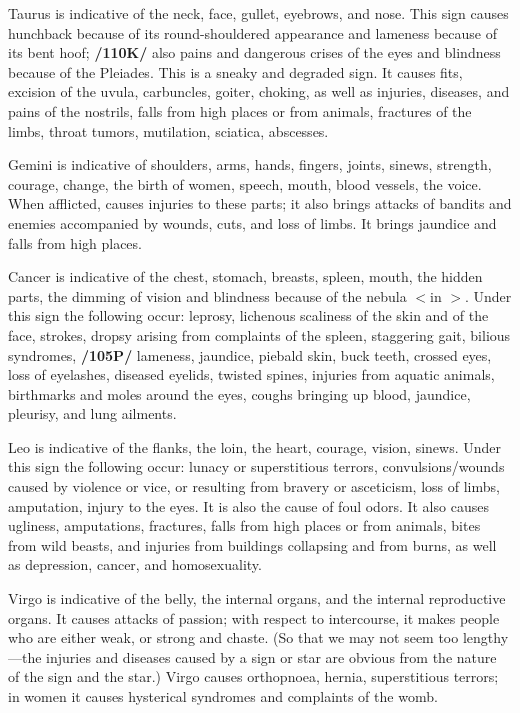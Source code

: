 Taurus \mn{\Taurus} is indicative of the neck, face, gullet, eyebrows, and nose. This sign causes hunchback because
of its round-shouldered appearance and lameness because of its bent hoof; \textbf{/110K/} also pains and dangerous crises of the eyes and blindness because of the Pleiades. This is a sneaky and degraded sign. It causes fits, excision of the uvula, carbuncles, goiter, choking, as well as injuries, diseases, and pains of the nostrils, falls from high places or from animals, fractures of the limbs, throat tumors, mutilation, sciatica, abscesses.

Gemini \mn{\Gemini} is indicative of shoulders, arms, hands, fingers, joints, sinews, strength, courage, change, the
birth of women, speech, mouth, blood vessels, the voice. When afflicted, \Gemini\xspace causes injuries to these parts; it also brings attacks of bandits and enemies accompanied by wounds, cuts, and loss of limbs. It brings jaundice and falls from high places.

Cancer \mn{\Cancer} is indicative of the chest, stomach, breasts, spleen, mouth, the hidden parts, the dimming of vision and blindness because of the nebula $<$in \Cancer$>$. Under this sign the following occur: leprosy,
lichenous scaliness of the skin and of the face, strokes, dropsy arising from complaints of the spleen, staggering gait, bilious syndromes, \textbf{/105P/} lameness, jaundice, piebald skin, buck teeth, crossed eyes, loss of eyelashes, diseased eyelids, twisted spines, injuries from aquatic animals, birthmarks and moles around the eyes, coughs bringing up blood, jaundice, pleurisy, and lung ailments.

Leo \mn{\Leo} is indicative of the flanks, the loin, the heart, courage, vision, sinews. Under this sign the
following occur: lunacy or superstitious terrors, convulsions/wounds caused by violence or vice, or resulting from bravery or asceticism, loss of limbs, amputation, injury to the eyes. It is also the cause of foul odors. It also causes ugliness, amputations, fractures, falls from high places or from animals, bites from wild beasts, and injuries from buildings collapsing and from burns, as well as depression, cancer, and
homosexuality.

Virgo \mn{\Virgo} is indicative of the belly, the internal organs, and the internal reproductive organs. It causes attacks of passion; with respect to intercourse, it makes people who are either weak, or strong and chaste.
(So that we may not seem too lengthy—the injuries and diseases caused by a sign or star are obvious from the nature of the sign and the star.) Virgo causes orthopnoea, hernia, superstitious terrors; in women it causes hysterical syndromes and complaints of the womb.

